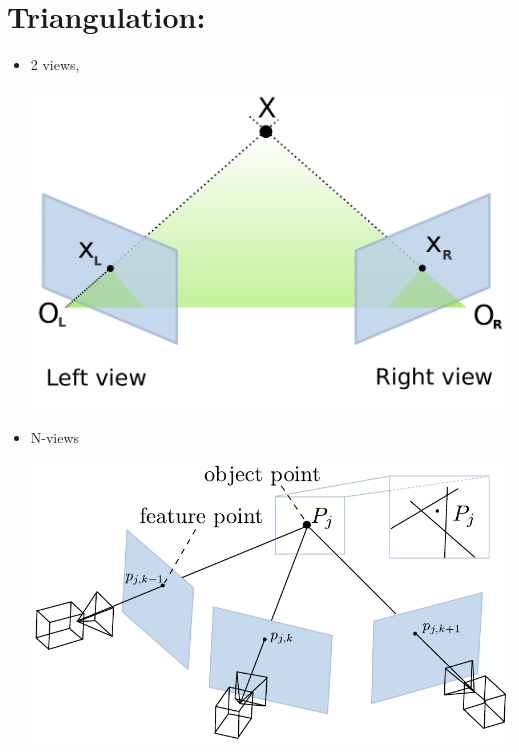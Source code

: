 \documentclass[11pt, letterpaper]{report}
\begin{document}
\chapter{Triangulation:}
\begin{itemize}
\item 2 views,
\newline
\begin{center}
\includegraphics[scale=.5]{figures/triangulation_geometry}
\end{center}
\item N-views
\newline
\begin{center}
\includegraphics[scale=.6]{figures/triangulation_n_geometry}
\end{center}
\end{itemize}

\newpage
\end{document}
